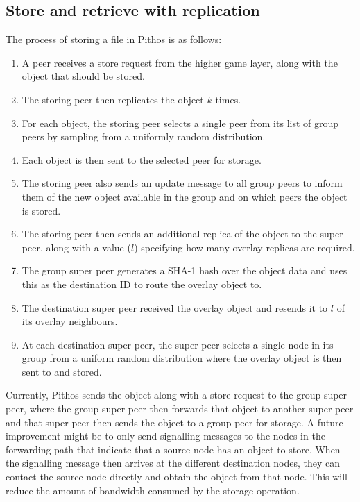 \documentclass[10pt,a4paper,conference]{IEEEtran}
\begin{document}
\subsection{Store and retrieve with replication}
\label{store_retrieve}

The process of storing a file in Pithos is as follows:
\begin{enumerate}
\item A peer receives a store request from the higher game layer, along with the object that should be stored.
\item The storing peer then replicates the object $k$ times.
\item For each object, the storing peer selects a single peer from its list of group peers by sampling from a uniformly random distribution.
\item Each object is then sent to the selected peer for storage.
\item The storing peer also sends an update message to all group peers to inform them of the new object available in the group and on which peers
    the object is stored.
\item The storing peer then sends an additional replica of the object to the super peer, along with a value ($l$) specifying how many overlay
    replicas are required.
\item The group super peer generates a SHA-1 hash over the object data and uses this as the destination ID to route the overlay object to.
\item The destination super peer received the overlay object and resends it to $l$ of its overlay neighbours.
\item At each destination super peer, the super peer selects a single node in its group from a uniform random distribution where the overlay
    object is then sent to and stored.
\end{enumerate}

Currently, Pithos sends the object along with a store request to the group super peer, where the group super peer then forwards that object to
another super peer and that super peer then sends the object to a group peer for storage. A future improvement might be to only send signalling
messages to the nodes in the forwarding path that indicate that a source node has an object to store. When the signalling message then arrives at the
different destination nodes, they can contact the source node directly and obtain the object from that node. This will reduce the amount of bandwidth
consumed by the storage operation.
\end{document}
